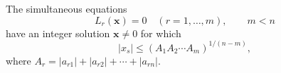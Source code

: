 \begin{proposition}
    The simultaneous equations
\[
    L_r(\mathbf{x})=0\quad(r=1,\ldots,m),\qquad m<n
\]
    have an integer solution $\mathbf{x}\ne0$ for which
\[
    |x_s|\le (A_1A_2\cdots A_m)^{1/(n-m)},
\]
    where $A_r=|a_{r1}|+|a_{r2}|+\cdots+|a_{rn}|$.
\end{proposition}
